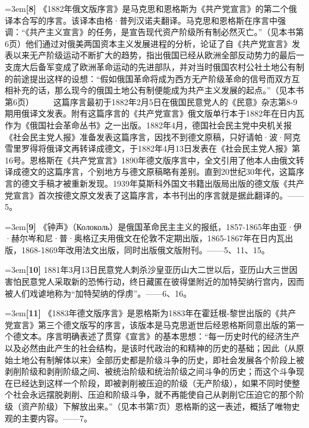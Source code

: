 \documentclass[UTF8,zihao=-4,a4paper]{ctexart}
\begin{document}
\noindent\hangindent=3em\textbf{[8]} 《1882年俄文版序言》是马克思和恩格斯为《共产党宣言》的第二个俄译本合写的序言。该译本由格·普列汉诺夫翻译。马克思和恩格斯在序言中强调：“《共产主义宣言》的任务，是宣告现代资产阶级所有制必然灭亡。”（见本书第6页）他们通过对俄美两国资本主义发展进程的分析，论证了自《共产党宣言》发表以来无产阶级运动不断扩大的趋势，指出俄国已经从欧洲全部反动势力的最后一支庞大后备军变成了欧洲革命运动的先进部队，并对当时俄国农村公社土地公有制的前途提出这样的设想：“假如俄国革命将成为西方无产阶级革命的信号而双方互相补充的话，那么现今的俄国土地公有制便能成为共产主义发展的起点。”（见本书第6页）  　　这篇序言最初于1882年2月5日在俄国民意党人的《民意》杂志第8-9期用俄译文发表。附有这篇序言的《共产党宣言》俄文版单行本于1882年在日内瓦作为《俄国社会革命丛书》之一出版。1882年4月，德国社会民主党中央机关报《社会民主党人报》准备发表这篇序言，因找不到德文原稿，只好请帕·波·阿克雪里罗得将俄译文再转译成德文，于1882年4月13日发表在《社会民主党人报》第16号。恩格斯在《共产党宣言》1890年德文版序言中，全文引用了他本人由俄文转译成德文的这篇序言，个别地方与德文原稿略有差别。直到20世纪30年代，这篇序言的德文手稿才被重新发现。1939年莫斯科外国文书籍出版局出版的德文版《共产党宣言》首次按德文原文发表了这篇序言，本书刊出的序言就是据此翻译的。——5。\par
\noindent\hangindent=3em\textbf{[9]} 《钟声》（Колоколь）是俄国革命民主主义的报纸，1857-1865年由亚·伊·赫尔岑和尼·普·奥格辽夫用俄文在伦敦不定期出版，1865-1867年在日内瓦出版，1868-1869年改用法文出版，同时出版俄文版附刊。——5、11、15。\par
\noindent\hangindent=3em\textbf{[10]} 1881年3月13日民意党人刺杀沙皇亚历山大二世以后，亚历山大三世因害怕民意党人采取新的恐怖行动，终日藏匿在彼得堡附近的加特契纳行宫内，因而被人们戏谑地称为“加特契纳的俘虏”。——6、16。\par
\noindent\hangindent=3em\textbf{[11]} 《1883年德文版序言》是恩格斯为1883年在霍廷根-黎世出版的《共产党宣言》第三个德文版写的序言，该版本是马克思逝世后经恩格斯同意出版的第一个德文本。序言明确表述了贯穿《宣言》的基本思想：“每一历史时代的经济生产以及必然由此产生的社会结构，是该时代政治的和精神的历史的基础；因此（从原始土地公有制解体以来）全部历史都是阶级斗争的历史，即社会发展各个阶段上被剥削阶级和剥削阶级之间、被统治阶级和统治阶级之间斗争的历史；而这个斗争现在已经达到这样一个阶段，即被剥削被压迫的阶级（无产阶级），如果不同时使整个社会永远摆脱剥削、压迫和阶级斗争，就不再能使自己从剥削它压迫它的那个阶级（资产阶级）下解放出来。”（见本书第7页）恩格斯的这一表述，概括了唯物史观的主要内容。——7。\par
\end{document}
